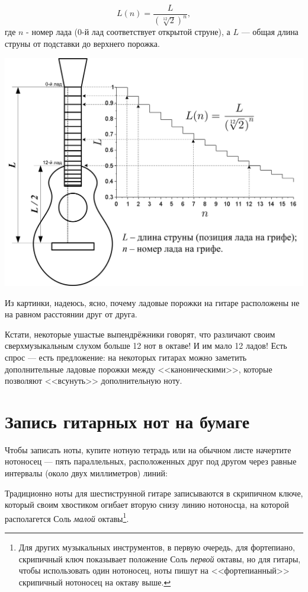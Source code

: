 \[L(n)=\frac{L}{(\sqrt[12]{2})^n},\]
где $n$ - номер лада ($0$-й лад соответствует открытой струне), а $L$ --- общая длина струны от подставки до верхнего порожка.


\includegraphics{fig/string-length.png}


Из картинки, надеюсь, ясно, почему ладовые порожки на гитаре расположены не на равном расстоянии друг от друга.

Кстати, некоторые ушастые выпендрёжники говорят, что различают своим сверхмузыкальным слухом больше 12 нот в октаве! И им мало 12 ладов! Есть спрос --- есть предложение: на некоторых гитарах можно заметить дополнительные ладовые порожки между <<каноническими>>, которые позволяют <<всунуть>> дополнительную ноту.


\section{Запись гитарных нот на бумаге}

Чтобы записать ноты, купите нотную тетрадь или на обычном листе начертите нотоносец --- пять параллельных, расположенных друг под другом через равные интервалы (около двух миллиметров) линий:
 

Традиционно ноты для шестиструнной гитаре записываются в скрипичном ключе, который своим хвостиком огибает вторую снизу линию нотоносца, на которой располагется Соль \emph{малой} октавы\footnote{Для других музыкальных инструментов, в первую очередь, для фортепиано, скрипичный ключ показывает положение Соль \emph{первой} октавы, но для гитары, чтобы использовать один нотоносец, ноты пишут на <<фортепианный>> скрипичный нотоносец на октаву выше.}.


